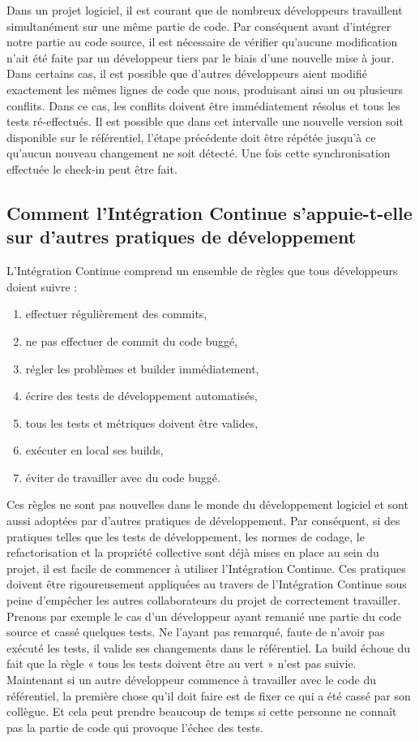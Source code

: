    Dans un projet logiciel, il est courant que de nombreux développeurs travaillent simultanément sur une même partie de code.  Par conséquent avant d’intégrer notre partie au code source, il est nécessaire de vérifier qu’aucune modification n’ait été faite par un développeur tiers par le biais d’une nouvelle mise à jour. Dans certains cas, il est possible que d’autres développeurs aient modifié exactement les mêmes lignes de code que nous, produisant ainsi un ou plusieurs conflits. Dans ce cas, les conflits doivent être immédiatement résolus et tous les tests ré-effectués. Il est possible que dans cet intervalle une nouvelle version soit disponible sur le référentiel, l'étape précédente doit être répétée jusqu'à ce qu'aucun nouveau changement ne soit détecté. Une fois cette synchronisation effectuée le check-in peut être fait.

    \subsection{Comment l’Intégration Continue s’appuie-t-elle sur d’autres pratiques de développement}\label{Developers}
    L’Intégration Continue comprend un ensemble de règles que tous développeurs doient suivre :

    \begin{enumerate}
      \item effectuer régulièrement des commits,
      \item ne pas effectuer de commit du code buggé,
      \item régler les problèmes et builder immédiatement,
      \item écrire des tests de développement automatisés,
      \item tous les tests et métriques doivent être valides,
      \item exécuter en local ses builds,
      \item éviter de travailler avec du code buggé.\\
    \end{enumerate}

    Ces règles ne sont pas nouvelles dans le monde du développement logiciel et sont aussi adoptées par d'autres pratiques de développement. Par conséquent, si des pratiques telles que les tests de développement, les normes de codage, le refactorisation et la propriété collective sont déjà mises en place au sein du projet, il est facile de commencer à utiliser l’Intégration Continue. Ces pratiques doivent être rigoureusement appliquées au travers de l’Intégration Continue sous peine d’empêcher les autres collaborateurs du projet de correctement travailler. Prenons par exemple le cas d’un développeur ayant remanié une partie du code source et cassé quelques tests. Ne l’ayant pas remarqué, faute de n’avoir pas exécuté les tests, il valide ses changements dans le référentiel. La build échoue du fait que la règle « tous les tests doivent être au vert » n’est pas suivie. Maintenant si un autre développeur commence à travailler avec le code du référentiel, la première chose qu'il doit faire est de fixer ce qui a été cassé par son collègue. Et cela peut prendre beaucoup de temps si cette personne ne connaît pas la partie de code qui provoque l’échec des tests.

